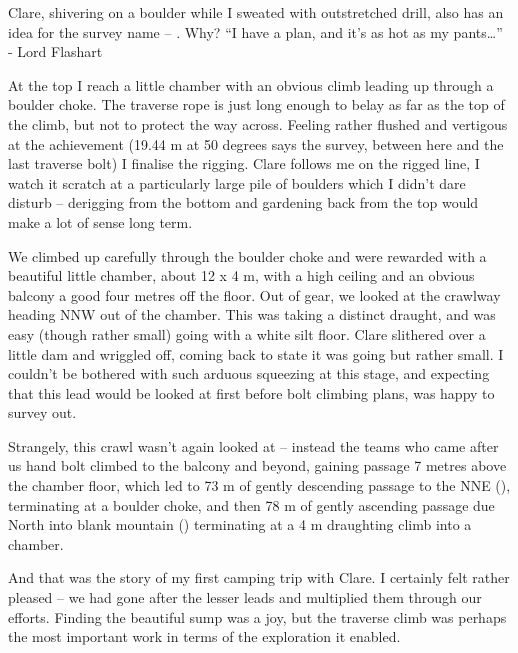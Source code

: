 Clare, shivering on a boulder while I sweated with outstretched drill,
also has an idea for the survey name -- . Why? ``I have a plan,
and it's as hot as my pants\ldots{}'' - Lord Flashart

At the top I reach a little chamber with an obvious climb leading up
through a boulder choke. The traverse rope is just long enough to belay
as far as the top of the climb, but not to protect the way across.
Feeling rather flushed and vertigous at the achievement (19.44 m at 50
degrees says the survey, between here and the last traverse bolt) I
finalise the rigging. Clare follows me on the rigged line, I watch it
scratch at a particularly large pile of boulders which I didn't dare
disturb -- derigging from the bottom and gardening back from the top
would make a lot of sense long term.

We climbed up carefully through the boulder choke and were rewarded with
a beautiful little chamber, about 12 x 4 m, with a high ceiling and an
obvious balcony a good four metres off the floor. Out of gear, we looked
at the crawlway heading NNW out of the chamber. This was taking a
distinct draught, and was easy (though rather small) going with a white
silt floor. Clare slithered over a little dam and wriggled off, coming
back to state it was going but rather small. I couldn't be bothered with
such arduous squeezing at this stage, and expecting that this lead would
be looked at first before bolt climbing plans, was happy to survey out.

Strangely, this crawl wasn't again looked at -- instead the teams who
came after us hand bolt climbed to the balcony and beyond, gaining
passage 7 metres above the chamber floor, which led to 73 m of gently
descending passage to the NNE (), terminating at a boulder
choke, and then 78 m of gently ascending passage due North into blank
mountain () terminating at a 4 m draughting climb
into a chamber.



And that was the story of my first camping trip with Clare. I certainly
felt rather pleased -- we had gone after the lesser leads and multiplied
them through our efforts. Finding the beautiful 
sump was a joy, but the  traverse climb was perhaps the most
important work in terms of the exploration it enabled.

